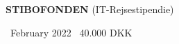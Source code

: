 {\large \color{accent} \textbf{STIBOFONDEN} (IT-Rejsestipendie)}

\smallskip

\faCalendar\ February 2022 \hspace{180pt} \faMoney\ 40.000 DKK
